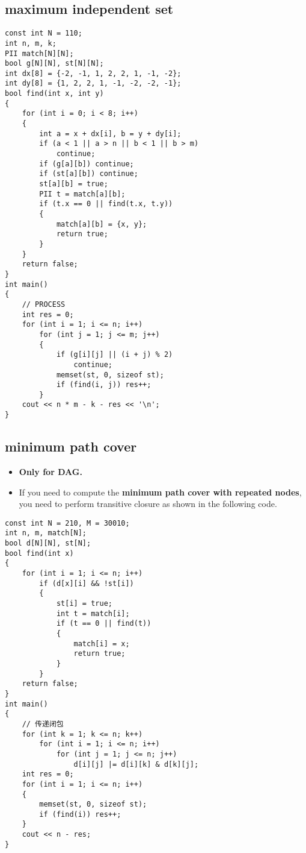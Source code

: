 \subsection{maximum independent set}
\begin{lstlisting}
const int N = 110;
int n, m, k;
PII match[N][N];
bool g[N][N], st[N][N];
int dx[8] = {-2, -1, 1, 2, 2, 1, -1, -2};
int dy[8] = {1, 2, 2, 1, -1, -2, -2, -1};
bool find(int x, int y)
{
    for (int i = 0; i < 8; i++)
    {
        int a = x + dx[i], b = y + dy[i];
        if (a < 1 || a > n || b < 1 || b > m)
            continue;
        if (g[a][b]) continue;
        if (st[a][b]) continue;
        st[a][b] = true;
        PII t = match[a][b];
        if (t.x == 0 || find(t.x, t.y))
        {
            match[a][b] = {x, y};
            return true;
        }
    }
    return false;
}
int main()
{
    // PROCESS
    int res = 0;
    for (int i = 1; i <= n; i++)
        for (int j = 1; j <= m; j++)
        {
            if (g[i][j] || (i + j) % 2)
                continue;
            memset(st, 0, sizeof st);
            if (find(i, j)) res++;
        }
    cout << n * m - k - res << '\n';
}
\end{lstlisting}
\subsection{minimum path cover}
\begin{itemize}
    \item \textbf{Only for DAG.}
    \item If you need to compute the \textbf{minimum path cover with repeated nodes}, you need to perform transitive closure as shown in the following code.
\end{itemize}
\begin{lstlisting}
const int N = 210, M = 30010;
int n, m, match[N];
bool d[N][N], st[N];
bool find(int x)
{
    for (int i = 1; i <= n; i++)
        if (d[x][i] && !st[i])
        {
            st[i] = true;
            int t = match[i];
            if (t == 0 || find(t))
            {
                match[i] = x;
                return true;
            }
        }
    return false;
}
int main()
{
    // 传递闭包
    for (int k = 1; k <= n; k++)
        for (int i = 1; i <= n; i++)
            for (int j = 1; j <= n; j++)
                d[i][j] |= d[i][k] & d[k][j];
    int res = 0;
    for (int i = 1; i <= n; i++)
    {
        memset(st, 0, sizeof st);
        if (find(i)) res++;
    }
    cout << n - res;
}
\end{lstlisting}
